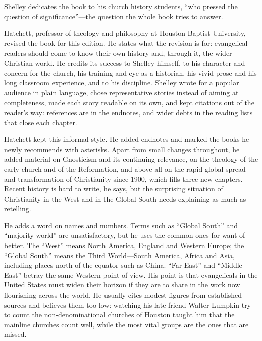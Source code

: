 
Shelley dedicates the book to his church history students, ``who pressed the question of significance''---the question the whole book tries to answer.

Hatchett, professor of theology and philosophy at Houston Baptist University, revised the book for this
edition. He states what the revision is for: evangelical readers should come to know their own history and, through it, the wider Christian world. He credits its success to Shelley himself, to his character and concern for the
church, his training and eye as a historian, his vivid prose and his long classroom experience, and
to his discipline. Shelley wrote for a popular audience in plain language, chose representative
stories instead of aiming at completeness, made each story readable on its own, and kept citations out
of the reader's way: references are in the endnotes, and wider debts in the reading lists that close
each chapter.

Hatchett kept this informal style. He added endnotes and marked the books he newly recommends with
asterisks. Apart from small changes throughout, he added material on Gnosticism and its continuing
relevance, on the theology of the early church and of the Reformation, and above all on the rapid
global spread and transformation of Christianity since 1900, which fills three new chapters. Recent
history is hard to write, he says, but the surprising situation of Christianity in the West and in the
Global South needs explaining as much as retelling.

He adds a word on names and numbers. Terms such as ``Global South'' and ``majority world'' are
unsatisfactory, but he uses the common ones for want of better. The ``West'' means North America,
England and Western Europe; the ``Global South'' means the Third World---South America, Africa and
Asia, including places north of the equator such as China. ``Far East'' and ``Middle East'' betray the
same Western point of view. His point is that evangelicals in the United States must widen their horizon
if they are to share in the work now flourishing across the world. He usually cites modest figures from
established sources and believes them too low: watching his late friend Walter Lumpkin try to count the
non-denominational churches of Houston taught him that the mainline churches count well, while the most
vital groups are the ones that are missed.

